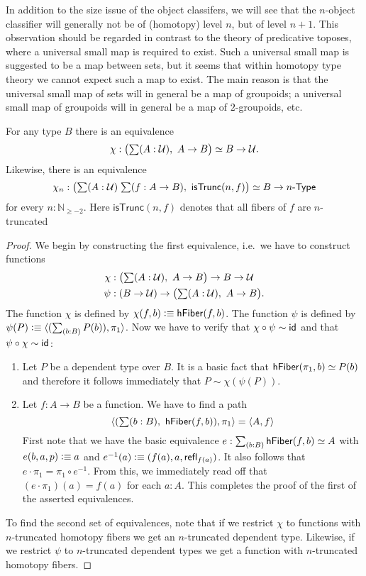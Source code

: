 In addition to the size issue of the object classifers, we will see that the
$n$-object classifier will generally not be of (homotopy) level $n$, but of level
$n+1$. This observation should be regarded in contrast to the theory of 
predicative toposes, where a universal small
map is required to exist. Such a universal small map is suggested to be a map
between sets, 
but it seems that within homotopy type theory we cannot expect
such a map to exist. The main reason is that the universal small map of sets
will in general be a map of groupoids; a universal small map of groupoids will
in general be a map of $2$-groupoids, etc.

\begin{thm}\label{thm:nobject_classifier_appetizer}
For any type $B$ there is an equivalence
\begin{equation*}
\chi:\big(\sm{A:\type} A\to B\big)\simeq B\to\type.
\end{equation*}
Likewise, there is an equivalence
\begin{equation*}
\chi_n:\big(\sm{A:\type}{f:A\to B} \mathsf{isTrunc}(n,f)\big)\simeq B\to \typele{n}
\end{equation*}
for every $n:\mathbb{N}_{\geq-2}$. Here $\mathsf{isTrunc}(n,f)$ denotes that all fibers of $f$ are $n$-truncated
\end{thm}

\begin{proof}
We begin by constructing the first equivalence, i.e.\ we have to construct functions
\begin{align*}
\chi & : \big(\sm{A:\type} A\to B\big)\to B\to\type\\
\psi & : (B\to\type)\to\big(\sm{A:\type} A\to B\big).
\end{align*}
The function $\chi$ is defined by $\chi(f,b)\vcentcolon\equiv\mathsf{hFiber}(f,b)$. The
function $\psi$ is defined by $\psi(P)\defeq\pairr{(\sm{b:B} P(b)),\pi_1}$. Now
we have to verify that $\chi\circ\psi\sim\mathsf{id}_{}{}$ and that $\psi\circ\chi
\sim\mathsf{id}_{}{}$:
\begin{enumerate}
\item Let $P$ be a dependent type over $B$. It is a basic fact that 
$\mathsf{hFiber}(\pi_1,b)\simeq P(b)$ and therefore it follows immediately
that $P\sim\chi(\psi(P))$.
\item Let $f:A\to B$ be a function. We have to find a path
\begin{equation*}
\pairr{(\sm{b:B} \hfiber{f}b),\pi_1}=\pairr{A,f}
\end{equation*}
First note that we have the basic equivalence
$e:\sm{b:B} \hfiber{f}b\simeq A$ with $e(b,a,p)\vcentcolon\equiv a$ and $e^{-1}(a)
\vcentcolon\equiv(f(a),a,\mathsf{refl}_{f(a)})$. It also follows that
$e\cdot\pi_1=\pi_1\circ e^{-1}$. From this, we immediately read off
that $(e\cdot\pi_1)(a)= f(a)$ for each $a:A$. This completes the proof
of the first of the asserted equivalences.
\end{enumerate}
To find the second set of equivalences, note that if we restrict $\chi$ to
functions with $n$-truncated homotopy fibers we get an $n$-truncated dependent
type. Likewise, if we restrict $\psi$ to $n$-truncated dependent types we get
a function with $n$-truncated homotopy fibers.
\end{proof}

